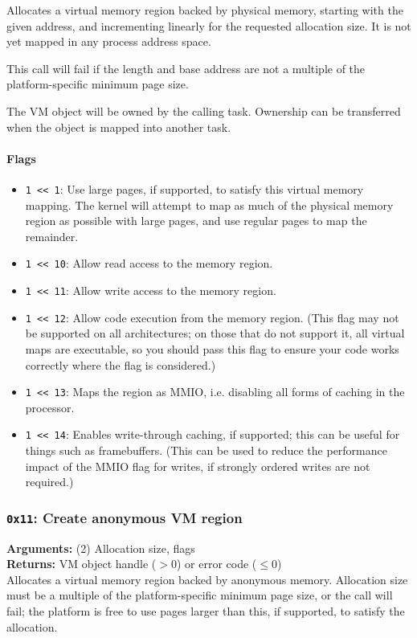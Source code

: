 \documentclass[11pt]{article}
\begin{document}
Allocates a virtual memory region backed by physical memory, starting with the given address, and incrementing linearly for the requested allocation size. It is not yet mapped in any process address space.

This call will fail if the length and base address are not a multiple of the platform-specific minimum page size.

The VM object will be owned by the calling task. Ownership can be transferred when the object is mapped into another task.

\paragraph{Flags}
\begin{itemize}
\item \texttt{1 << 1}: Use large pages, if supported, to satisfy this virtual memory mapping. The kernel will attempt to map as much of the physical memory region as possible with large pages, and use regular pages to map the remainder.
\item \texttt{1 << 10}: Allow read access to the memory region.
\item \texttt{1 << 11}: Allow write access to the memory region.
\item \texttt{1 << 12}: Allow code execution from the memory region. (This flag may not be supported on all architectures; on those that do not support it, all virtual maps are executable, so you should pass this flag to ensure your code works correctly where the flag is considered.)
\item \texttt{1 << 13}: Maps the region as MMIO, i.e. disabling all forms of caching in the processor.
\item \texttt{1 << 14}: Enables write-through caching, if supported; this can be useful for things such as framebuffers. (This can be used to reduce the performance impact of the MMIO flag for writes, if strongly ordered writes are not required.)
\end{itemize}

\subsubsection{{\tt 0x11}: Create anonymous VM region}
\textbf{Arguments:} (2) Allocation size, flags  \\
\textbf{Returns:} VM object handle ($>0$) or error code ($\leq0$) \\

Allocates a virtual memory region backed by anonymous memory. Allocation size must be a multiple of the platform-specific minimum page size, or the call will fail; the platform is free to use pages larger than this, if supported, to satisfy the allocation.
\end{document}

